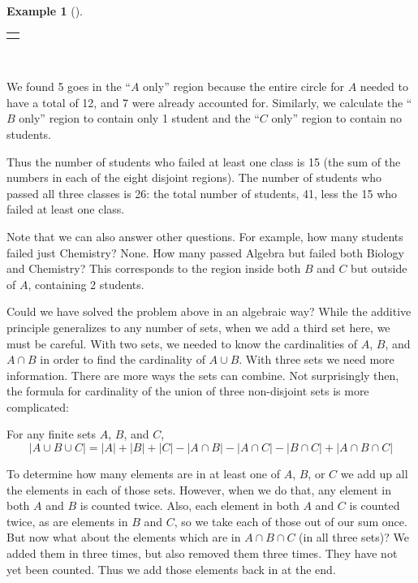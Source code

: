 \documentclass[10pt,]{book}
\theoremstyle{plain}
\theoremstyle{definition}
\theoremstyle{definition}
\newtheorem{example}[theorem]{Example}
\theoremstyle{definition}
\theoremstyle{definition}
\numberwithin{equation}{chapter}
\newlength{\panelmax}
\newcommand{\card}[1]{\left| #1 \right|}
\begin{document}
\begin{example}[]
{\begin{tabular}{@{}*{1}{c}@{}}
\begin{minipage}[c][\panelmax][t]{0.36\linewidth}\usebox{\panelboxAimage}\end{minipage}\end{tabular}\\
}%
\par
\hypertarget{p-736}{}%
We found 5 goes in the ``\(A\) only'' region because the entire circle for \(A\) needed to have a total of 12, and 7 were already accounted for. Similarly, we calculate the ``\(B\) only'' region to contain only 1 student and the ``\(C\) only'' region to contain no students.%
\par
\hypertarget{p-737}{}%
Thus the number of students who failed at least one class is 15 (the sum of the numbers in each of the eight disjoint regions). The number of students who passed all three classes is 26: the total number of students, 41, less the 15 who failed at least one class.%
\par
\hypertarget{p-738}{}%
Note that we can also answer other questions. For example, how many students failed just Chemistry? None. How many passed Algebra but failed both Biology and Chemistry? This corresponds to the region inside both \(B\) and \(C\) but outside of \(A\), containing 2 students.%
\end{example}
\hypertarget{p-739}{}%
Could we have solved the problem above in an algebraic way? While the additive principle generalizes to any number of sets, when we add a third set here, we must be careful. With two sets, we needed to know the cardinalities of \(A\), \(B\), and \(A \cap B\) in order to find the cardinality of \(A \cup B\). With three sets we need more information. There are more ways the sets can combine. Not surprisingly then, the formula for cardinality of the union of three non-disjoint sets is more complicated:%
\begin{assemblage}\label{assemblage-17}
\hypertarget{p-740}{}%
For any finite sets \(A\), \(B\), and \(C\),%
\begin{equation*}
\card{A \cup B \cup C} = \card{A} + \card{B} + \card{C} - \card{A \cap B} - \card{A \cap C} - \card{B \cap C} + \card{A \cap B \cap C}
\end{equation*}
%
\end{assemblage}
\hypertarget{p-741}{}%
To determine how many elements are in at least one of \(A\), \(B\), or \(C\) we add up all the elements in each of those sets. However, when we do that, any element in both \(A\) and \(B\) is counted twice. Also, each element in both \(A\) and \(C\) is counted twice, as are elements in \(B\) and \(C\), so we take each of those out of our sum once. But now what about the elements which are in \(A \cap B \cap C\) (in all three sets)? We added them in three times, but also removed them three times. They have not yet been counted. Thus we add those elements back in at the end.%
\end{document}
